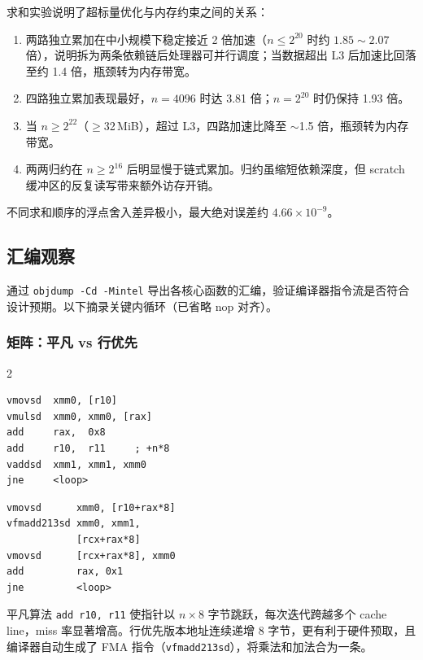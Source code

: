 \documentclass[a4paper,11pt,UTF8]{ctexart}
\begin{document}
求和实验说明了超标量优化与内存约束之间的关系：
\begin{enumerate}
  \item 两路独立累加在中小规模下稳定接近 2 倍加速（$n \leq 2^{20}$ 时约 $1.85 \sim 2.07$ 倍），说明拆为两条依赖链后处理器可并行调度；当数据超出 L3 后加速比回落至约 1.4 倍，瓶颈转为内存带宽。
  \item 四路独立累加表现最好，$n=4096$ 时达 3.81 倍；$n=2^{20}$ 时仍保持 1.93 倍。
  \item 当 $n \geq 2^{22}$（$\geq$32\,MiB），超过 L3，四路加速比降至 $\sim$1.5 倍，瓶颈转为内存带宽。
  \item 两两归约在 $n \geq 2^{16}$ 后明显慢于链式累加。归约虽缩短依赖深度，但 scratch 缓冲区的反复读写带来额外访存开销。
\end{enumerate}

不同求和顺序的浮点舍入差异极小，最大绝对误差约 $4.66\times 10^{-9}$。

\subsection{汇编观察}
通过 \texttt{objdump -Cd -Mintel} 导出各核心函数的汇编，验证编译器指令流是否符合设计预期。以下摘录关键内循环（已省略 nop 对齐）。

\subsubsection{矩阵：平凡 vs 行优先}

\begin{multicols}{2}
\begin{lstlisting}[caption=naive 内循环,basicstyle=\ttfamily\tiny,numbers=none]
vmovsd  xmm0, [r10]
vmulsd  xmm0, xmm0, [rax]
add     rax,  0x8
add     r10,  r11     ; +n*8
vaddsd  xmm1, xmm1, xmm0
jne     <loop>
\end{lstlisting}
\columnbreak
\begin{lstlisting}[caption=row\_major 内循环,basicstyle=\ttfamily\tiny,numbers=none]
vmovsd      xmm0, [r10+rax*8]
vfmadd213sd xmm0, xmm1,
            [rcx+rax*8]
vmovsd      [rcx+rax*8], xmm0
add         rax, 0x1
jne         <loop>
\end{lstlisting}
\end{multicols}

平凡算法 \texttt{add r10, r11} 使指针以 $n \times 8$ 字节跳跃，每次迭代跨越多个 cache line，miss 率显著增高。行优先版本地址连续递增 8 字节，更有利于硬件预取，且编译器自动生成了 FMA 指令（\texttt{vfmadd213sd}），将乘法和加法合为一条。
\end{document}
